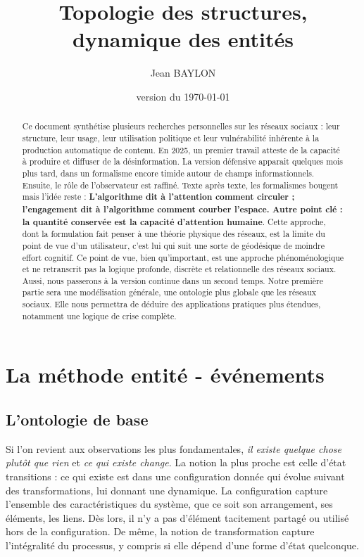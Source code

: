 \documentclass{report}
\title{Topologie des structures, dynamique des entités}
\author{Jean BAYLON}
\date{version du \today{}}
\begin{document}
	\maketitle
	
	\begin{abstract}
		Ce document synthétise plusieurs recherches personnelles sur les réseaux sociaux : leur structure, leur usage, leur utilisation politique et leur vulnérabilité inhérente à la production automatique de contenu. En 2025, un premier travail atteste de la capacité à produire et diffuser de la désinformation. La version défensive apparait quelques mois plus tard, dans un formalisme encore timide autour de champs informationnels. Ensuite, le rôle de l'observateur est raffiné. Texte après texte, les formalismes bougent mais l'idée reste : \textbf{L'algorithme dit à l'attention comment circuler ; l'engagement dit à l'algorithme comment courber l'espace. Autre point clé : la quantité conservée est la capacité d'attention humaine}. Cette approche, dont la formulation fait penser à une théorie physique des réseaux, est la limite du point de vue d'un utilisateur, c'est lui qui suit une sorte de géodésique de moindre effort cognitif. Ce point de vue, bien qu'important, est une approche phénoménologique et ne retranscrit pas la logique profonde, discrète et relationnelle des réseaux sociaux. Aussi, nous passerons à la version continue dans un second temps. Notre première partie sera une modélisation générale, une ontologie plus globale que les réseaux sociaux. Elle nous permettra de déduire des applications pratiques plus étendues, notamment une logique de crise complète. 
	\end{abstract}

	\tableofcontents
	
	\part{La méthode entité - événements}
	
	\chapter{L'ontologie de base}
	
	Si l'on revient aux observations les plus fondamentales, \textit{il existe quelque chose plutôt que rien} et \textit{ce qui existe change}. La notion la plus proche est celle d'état transitions : ce qui existe est dans une configuration donnée qui évolue suivant des transformations, lui donnant une dynamique. La configuration capture l'ensemble des caractéristiques du système, que ce soit son arrangement, ses éléments, les liens. Dès lors, il n'y a pas d'élément tacitement partagé ou utilisé hors de la configuration. De même, la notion de transformation capture l'intégralité du processus, y compris si elle dépend d'une forme d'état quelconque. 
	
\end{document}
